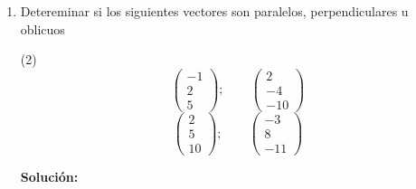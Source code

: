 \documentclass[12pt]{article}
\newenvironment{solucion}
{\begin{mdframed}[backgroundcolor=black!10]
		{\bf Solución:}\\
	}
	{
	\end{mdframed}
}
\newenvironment{preguntas}
{\begin{enumerate}\itemsep12pt
	}
	{
	\end{enumerate}
}
\begin{document}
\begin{preguntas}
\begin{solucion}
\begin{enumerate}[a)]
$$\begin{pmatrix}
			15\\
			-5\\
			-5
			\end{pmatrix}  + 3 \begin{pmatrix}
			2\\
			1\\
			5
			\end{pmatrix} = \begin{pmatrix}
			21\\
			-2\\
			10
			\end{pmatrix} $$
			Para obtener un vector perpendicular, podemos hacer producto cruz con cualquier otro vector arbitrario. Para hacer los calculos simples, utilizaremos
			$$v_7 = \begin{pmatrix}
			1\\
			0\\
			0
			\end{pmatrix} $$
			Luego, 
			$$v_8 = v_6 \times v_7 = \begin{pmatrix}
			21\\
			-2\\
			10
			\end{pmatrix} \times \begin{pmatrix}
			1\\
			0\\
			0
			\end{pmatrix} = 10j + 2k = \begin{pmatrix}
			0\\
			-10\\
			2
			\end{pmatrix}$$
\end{enumerate}
\end{solucion}
\item Detereminar si los siguientes vectores son paralelos, perpendiculares u oblicuos
\begin{tasks}(2)
\task $$ 
			\begin{pmatrix}
			-1\\
			2\\
			5
		\end{pmatrix};\qquad
			\begin{pmatrix}
			2\\
			-4\\
			-10
		\end{pmatrix}$$
\task  $$ 
			\begin{pmatrix}
			2\\
			5\\
			10
		\end{pmatrix};\qquad
			\begin{pmatrix}
			-3\\
			8\\
			-11
		\end{pmatrix}$$
\end{tasks}
\begin{solucion}


\end{solucion}
\end{preguntas}
\end{document}
